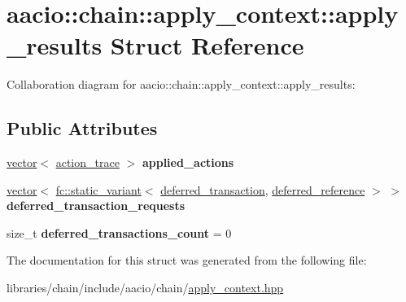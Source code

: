 \hypertarget{structaacio_1_1chain_1_1apply__context_1_1apply__results}{}\section{aacio\+:\+:chain\+:\+:apply\+\_\+context\+:\+:apply\+\_\+results Struct Reference}
\label{structaacio_1_1chain_1_1apply__context_1_1apply__results}


Collaboration diagram for aacio\+:\+:chain\+:\+:apply\+\_\+context\+:\+:apply\+\_\+results\+:
\subsection*{Public Attributes}
\begin{DoxyCompactItemize}
\item 
\mbox{\label{structaacio_1_1chain_1_1apply__context_1_1apply__results_ae5a7e710750bac93ec312dc10e6b976b}} 
\mbox{\hyperlink{classstd_1_1vector}{vector}}$<$ \mbox{\hyperlink{structaacio_1_1chain_1_1action__trace}{action\+\_\+trace}} $>$ {\bfseries applied\+\_\+actions}
\item 
\mbox{\label{structaacio_1_1chain_1_1apply__context_1_1apply__results_a8a228a2af54fc80ba4b23d062bf43689}} 
\mbox{\hyperlink{classstd_1_1vector}{vector}}$<$ \mbox{\hyperlink{classfc_1_1static__variant}{fc\+::static\+\_\+variant}}$<$ \mbox{\hyperlink{structaacio_1_1chain_1_1deferred__transaction}{deferred\+\_\+transaction}}, \mbox{\hyperlink{structaacio_1_1chain_1_1deferred__reference}{deferred\+\_\+reference}} $>$ $>$ {\bfseries deferred\+\_\+transaction\+\_\+requests}
\item 
\mbox{\label{structaacio_1_1chain_1_1apply__context_1_1apply__results_a0a69a3073d9b2e0cf548bc50a2fcb7b2}} 
size\+\_\+t {\bfseries deferred\+\_\+transactions\+\_\+count} = 0
\end{DoxyCompactItemize}


The documentation for this struct was generated from the following file\+:\begin{DoxyCompactItemize}
\item 
libraries/chain/include/aacio/chain/\mbox{\hyperlink{apply__context_8hpp}{apply\+\_\+context.\+hpp}}\end{DoxyCompactItemize}
